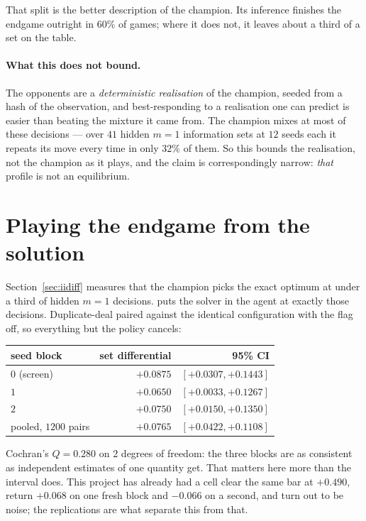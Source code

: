 \documentclass[11pt,a4paper]{article}
\begin{document}
That split is the better description of the champion. Its inference finishes
the endgame outright in 60\% of games; where it does not, it leaves about a
third of a set on the table.

\paragraph{What this does not bound.} The opponents are a \emph{deterministic
realisation} of the champion, seeded from a hash of the observation, and
best-responding to a realisation one can predict is easier than beating the
mixture it came from. The champion mixes at most of these decisions --- over
$41$ hidden $m = 1$ information sets at $12$ seeds each it repeats its move
every time in only $32\%$ of them. So this bounds the realisation, not the
champion as it plays, and the claim is correspondingly narrow: \emph{that}
profile is not an equilibrium.

\section{Playing the endgame from the solution}
\label{sec:exactplay}

Section~\ref{sec:iidiff} measures that the champion picks the exact optimum at
under a third of hidden $m = 1$ decisions.  puts
the solver in the agent at exactly those decisions. Duplicate-deal paired
against the identical configuration with the flag off, so everything but the
policy cancels:

\begin{center}
\begin{tabular}{lrr}
\toprule
seed block & set differential & 95\% CI \\
\midrule
$0$ (screen) & $+0.0875$ & $[+0.0307, +0.1443]$ \\
$1$ & $+0.0650$ & $[+0.0033, +0.1267]$ \\
$2$ & $+0.0750$ & $[+0.0150, +0.1350]$ \\
\midrule
pooled, $1200$ pairs & $\mathbf{+0.0765}$ & $\mathbf{[+0.0422, +0.1108]}$ \\
\bottomrule
\end{tabular}
\end{center}

Cochran's $Q = 0.280$ on $2$ degrees of freedom: the three blocks are as
consistent as independent estimates of one quantity get. That matters here more
than the interval does. This project has already had a cell clear the same bar
at $+0.490$, return $+0.068$ on one fresh block and $-0.066$ on a second, and
turn out to be noise; the replications are what separate this from that.
\end{document}
